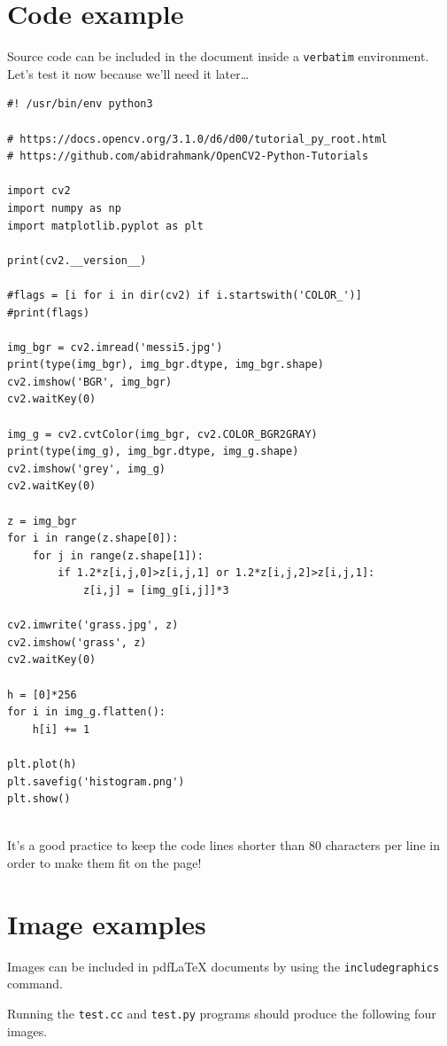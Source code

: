 \documentclass{article}
\begin{document}
\section{Code example}
\label{sec:code}

Source code can be included in the document inside a \texttt{verbatim}
environment.  Let's test it now because we'll need it later\ldots

\begin{verbatim}
#! /usr/bin/env python3

# https://docs.opencv.org/3.1.0/d6/d00/tutorial_py_root.html
# https://github.com/abidrahmank/OpenCV2-Python-Tutorials

import cv2
import numpy as np
import matplotlib.pyplot as plt

print(cv2.__version__)

#flags = [i for i in dir(cv2) if i.startswith('COLOR_')]
#print(flags)

img_bgr = cv2.imread('messi5.jpg')
print(type(img_bgr), img_bgr.dtype, img_bgr.shape)
cv2.imshow('BGR', img_bgr)
cv2.waitKey(0)

img_g = cv2.cvtColor(img_bgr, cv2.COLOR_BGR2GRAY)
print(type(img_g), img_bgr.dtype, img_g.shape)
cv2.imshow('grey', img_g)
cv2.waitKey(0)

z = img_bgr
for i in range(z.shape[0]):
    for j in range(z.shape[1]):
        if 1.2*z[i,j,0]>z[i,j,1] or 1.2*z[i,j,2]>z[i,j,1]:
            z[i,j] = [img_g[i,j]]*3

cv2.imwrite('grass.jpg', z)
cv2.imshow('grass', z)
cv2.waitKey(0)
           
h = [0]*256
for i in img_g.flatten():
    h[i] += 1

plt.plot(h)
plt.savefig('histogram.png')
plt.show()


\end{verbatim}

It's a good practice to keep the code lines shorter than 80 characters
per line in order to make them fit on the page!

\section{Image examples}
\label{sec:images}

Images can be included in pdf\LaTeX{} documents by using the
\texttt{includegraphics} command.

Running the \texttt{test.cc} and \texttt{test.py} programs should
produce the following four images.
\end{document}
